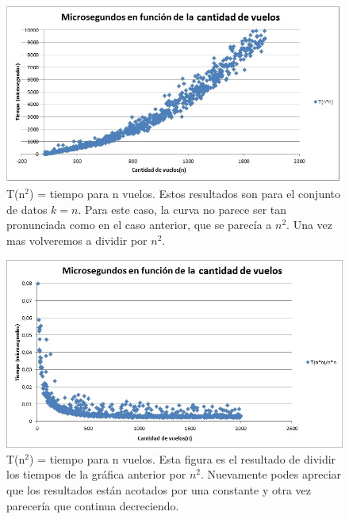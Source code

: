 \begin{figure}[H]
  \centering
  \includegraphics[scale=0.75]{Imagenes/Ej1/n}
  \caption{T(n$^{2}$) = tiempo para n vuelos. Estos resultados son para el conjunto de datos $k = n$. 
  Para este caso, la curva no parece ser tan pronunciada como en el caso anterior, que se parecía a $n^2$. 
  Una vez mas volveremos a dividir por $n^2$.}
  \label{}
\end{figure}

\begin{figure}[H]
  \centering
  \includegraphics[scale=0.75]{Imagenes/Ej1/nConst}
  \caption{T(n$^{2}$) = tiempo para n vuelos. Esta figura es el resultado de dividir los tiempos de la gráfica anterior por $n^2$.
    Nuevamente podes apreciar que los resultados están acotados por una constante y otra vez parecería que continua decreciendo.}
  \label{}
\end{figure}

